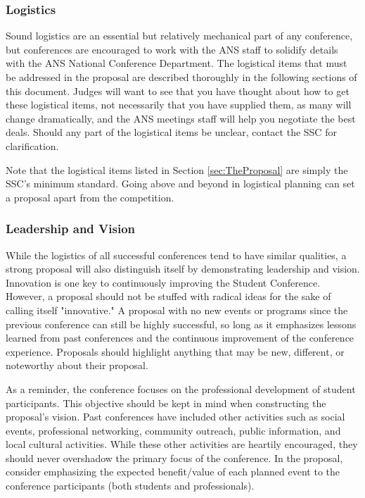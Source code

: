\documentclass[12pt]{article}
\begin{document}
\subsubsection{Logistics}
Sound logistics are an essential but relatively mechanical part of any conference, but conferences are encouraged to work with the ANS staff to solidify details with the ANS National Conference Department. The logistical items that must be addressed in the proposal are described thoroughly in the following sections of this document. Judges will want to see that you have thought about how to get these logistical items, not necessarily that you have supplied them, as many will change dramatically, and the ANS meetings staff will help you negotiate the best deals. Should any part of the logistical items be unclear, contact the SSC for clarification.

Note that the logistical items listed in Section \ref{sec:TheProposal} are simply the SSC’s minimum standard. Going above and beyond in logistical planning can set a proposal apart from the competition.

\subsubsection{Leadership and Vision} \label{sec:LandV}
While the logistics of all successful conferences tend to have similar qualities, a strong proposal will also distinguish itself by demonstrating leadership and vision. Innovation is one key to continuously improving the Student Conference. However, a proposal should not be stuffed with radical ideas for the sake of calling itself "innovative." A proposal with no new events or programs since the previous conference can still be highly successful, so long as it emphasizes lessons learned from past conferences and the continuous improvement of the conference experience. Proposals should highlight anything that may be new, different, or noteworthy about their proposal.

As a reminder, the conference focuses on the professional development of student participants. This objective should be kept in mind when constructing the proposal's vision. Past conferences have included other activities such as social events, professional networking, community outreach, public information, and local cultural activities. While these other activities are heartily encouraged, they should never overshadow the primary focus of the conference. In the proposal, consider emphasizing the expected benefit/value of each planned event to the conference participants (both students and professionals).
\end{document}
